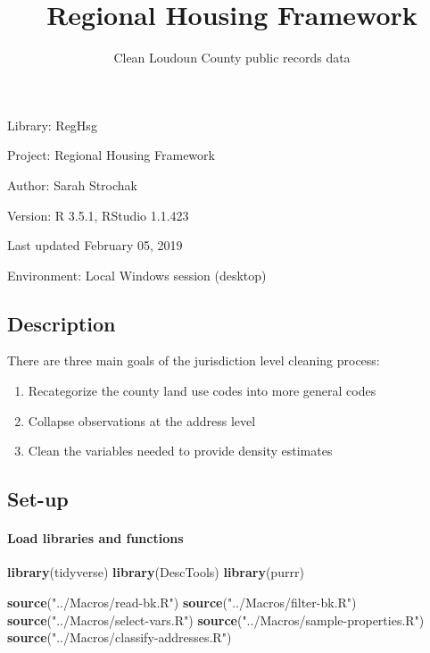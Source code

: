 \documentclass[]{article}
\title{Regional Housing Framework}
\subtitle{Clean Loudoun County public records data}
\author{}
\date{}
\newenvironment{Shaded}{\begin{snugshade}}{\end{snugshade}}
\newcommand{\KeywordTok}[1]{\textcolor[rgb]{0.13,0.29,0.53}{\textbf{#1}}}
\newcommand{\StringTok}[1]{\textcolor[rgb]{0.31,0.60,0.02}{#1}}
\newcommand{\NormalTok}[1]{#1}
\let\oldparagraph\paragraph
\renewcommand{\paragraph}[1]{\oldparagraph{#1}\mbox{}}
\begin{document}
\maketitle

{
\setcounter{tocdepth}{2}
\tableofcontents
}
Library: RegHsg

Project: Regional Housing Framework

Author: Sarah Strochak

Version: R 3.5.1, RStudio 1.1.423

Last updated February 05, 2019

Environment: Local Windows session (desktop)

\subsection{Description}\label{description}

There are three main goals of the jurisdiction level cleaning process:

\begin{enumerate}
\def\labelenumi{\arabic{enumi}.}
\item
  Recategorize the county land use codes into more general codes
\item
  Collapse observations at the address level
\item
  Clean the variables needed to provide density estimates
\end{enumerate}

\subsection{Set-up}\label{set-up}

\paragraph{Load libraries and
functions}\label{load-libraries-and-functions}

\begin{Shaded}
\begin{Highlighting}[]
\KeywordTok{library}\NormalTok{(tidyverse)}
\KeywordTok{library}\NormalTok{(DescTools)}
\KeywordTok{library}\NormalTok{(purrr)}

\KeywordTok{source}\NormalTok{(}\StringTok{"../Macros/read-bk.R"}\NormalTok{)}
\KeywordTok{source}\NormalTok{(}\StringTok{"../Macros/filter-bk.R"}\NormalTok{)}
\KeywordTok{source}\NormalTok{(}\StringTok{"../Macros/select-vars.R"}\NormalTok{)}
\KeywordTok{source}\NormalTok{(}\StringTok{"../Macros/sample-properties.R"}\NormalTok{)}
\KeywordTok{source}\NormalTok{(}\StringTok{"../Macros/classify-addresses.R"}\NormalTok{)}
\end{Highlighting}
\end{Shaded}
\end{document}
